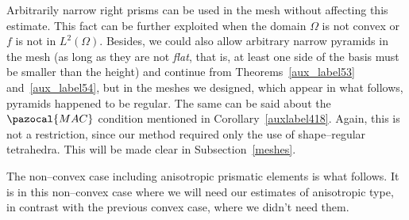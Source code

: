 Arbitrarily narrow right prisms can be used in the mesh without 
affecting this estimate. This fact can be further exploited when the
domain $\Omega$ is not convex or $f$ is not in $L^2(\Omega)$. Besides, we could
also allow arbitrary narrow pyramids in the mesh (as long as they are not \textit{flat},
that is, at least one side of the basis must be smaller than the height) and
continue from Theorems~\ref{aux_label53} and~\ref{aux_label54}, but in the meshes we 
designed, which appear in what follows, pyramids happened to be regular. 
The same can be said about the $\pazocal{MAC}$ condition mentioned
in Corollary~\ref{auxlabel418}. Again, this is not a restriction, since
our method required only the use of shape--regular tetrahedra. This will be made clear
in Subsection~\ref{meshes}.

The non--convex case including anisotropic prismatic elements is what follows. It is in
this non--convex case where we will need our estimates of anisotropic type,
in contrast with the previous convex case, where we didn't need them.
